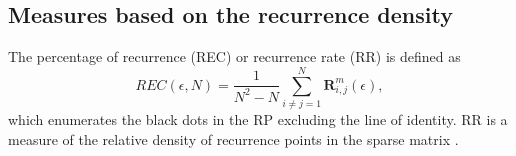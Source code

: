 \subsection{Measures based on the recurrence density}
The percentage of recurrence (REC) or recurrence rate (RR) is defined as
\begin{equation}
REC(\epsilon,N)= \frac{1}{N^2 - N} \sum^{N}_{i \neq j = 1} \mathbf{R}^{m}_{i,j}(\epsilon),
\end{equation}
which enumerates the black dots in the RP excluding the line of identity.
RR is a measure of the relative density of recurrence points in the sparse matrix 
\cite{marwan2015}.



